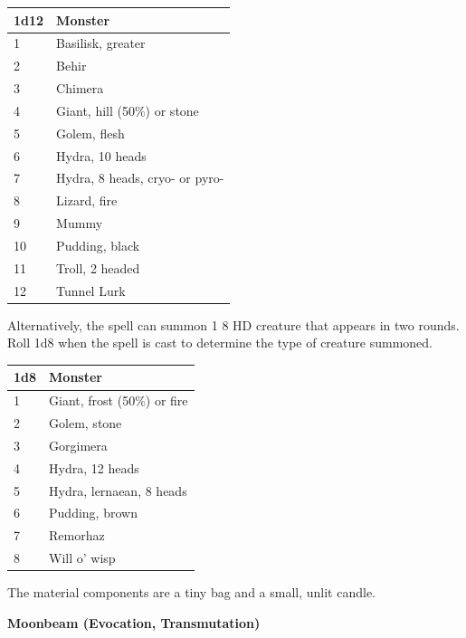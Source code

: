 \begin{multicols}{2}
\noindent
\begin{tabular}{|p{}|p{}|}
\hline
1d12	& Monster \\
\hline\hline
\rowcolor[gray]{.9}1	& Basilisk, greater \\
2	& Behir	 \\
\rowcolor[gray]{.9}3	& Chimera \\
4	& Giant, hill (50\%) or stone \\
\rowcolor[gray]{.9}5	& Golem, flesh \\
6	& Hydra, 10 heads \\
\rowcolor[gray]{.9}7	& Hydra, 8 heads, cryo- or pyro- \\
8	& Lizard, fire \\
\rowcolor[gray]{.9}9	& Mummy \\
10	& Pudding, black \\
\rowcolor[gray]{.9}11	& Troll, 2 headed \\
12	& Tunnel Lurk \\
\hline
\end{tabular}

Alternatively, the spell can summon 1 8 HD creature that appears in two rounds.  Roll 1d8 when the spell is cast to determine the type of creature summoned.

\noindent
\begin{tabular}{|p{}|p{}|}
\hline
1d8	& Monster \\
\hline\hline
\rowcolor[gray]{.9}1	& Giant, frost (50\%) or fire \\
2	& Golem, stone \\
\rowcolor[gray]{.9}3	& Gorgimera \\
4	& Hydra, 12 heads \\
\rowcolor[gray]{.9}5	& Hydra, lernaean, 8 heads \\
6	& Pudding, brown \\
\rowcolor[gray]{.9}7	& Remorhaz \\
8	& Will o' wisp \\
\hline
\end{tabular}

The material components are a tiny bag and a small, unlit candle.

\vspace{1em}

\noindent
\begin{minipage}{\columnwidth}

\noindent \textbf{Moonbeam (Evocation, Transmutation)}


\end{minipage}
\end{multicols}
